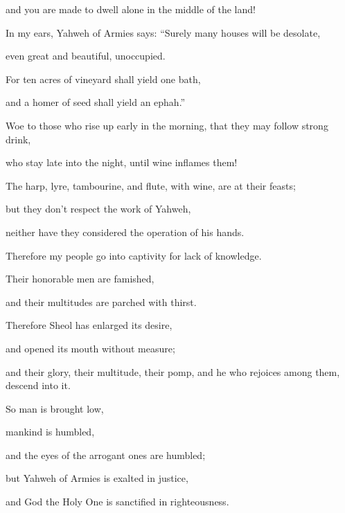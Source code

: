 {\par }{\QB and you are made to dwell alone in the middle of the land!
\par }{\Q {}In my ears, Yahweh of Armies says: “Surely many houses will be desolate,
\par }{\QB even great and beautiful, unoccupied.
\par }{\Q {}For ten acres of vineyard shall yield one bath,
\par }{\QB and a homer of seed shall yield an ephah.”
\par }{\Q {}Woe to those who rise up early in the morning, that they may follow strong drink,
\par }{\QB who stay late into the night, until wine inflames them!
\par }{\Q {}The harp, lyre, tambourine, and flute, with wine, are at their feasts;
\par }{\QB but they don’t respect the work of Yahweh,
\par }{\QB neither have they considered the operation of his hands.
\par }{\BB \par }{\Q {}Therefore my people go into captivity for lack of knowledge.
\par }{\QB Their honorable men are famished,
\par }{\QB and their multitudes are parched with thirst.
\par }{\Q {}Therefore Sheol has enlarged its desire,
\par }{\QB and opened its mouth without measure;
\par }{\QB and their glory, their multitude, their pomp, and he who rejoices among them, descend into it.
\par }{\Q {}So man is brought low,
\par }{\QB mankind is humbled,
\par }{\QB and the eyes of the arrogant ones are humbled;
\par }{\Q {}but Yahweh of Armies is exalted in justice,
\par }{\QB and God the Holy One is sanctified in righteousness.
}
